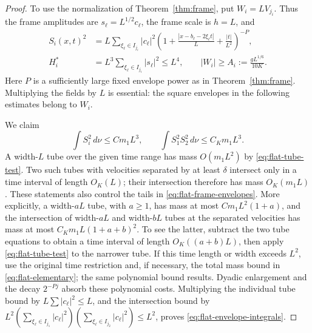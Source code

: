 \begin{proof}
To use the normalization of Theorem~\ref{thm:frame}, put
$W_i=LV_{j_i}$.  Thus the frame amplitudes are
$s_\ell=L^{1/2}c_\ell$, the frame scale is $h=L$, and
\begin{align}
 S_i(x,t)^2
   &=L\sum_{\xi_\ell\in I_{j_i}}|c_\ell|^2
     \left(1+\frac{|x-b_\ell-2\xi_\ell t|}{L}
                  +\frac{|t|}{L^2}\right)^{-P},
       \label{eq:flat-frame-envelopes}\\
 H_i^*&=L^3\sum_{\xi_\ell\in I_{j_i}}|s_\ell|^2\leq L^4,
 \qquad |W_i|\geq A_i:=\frac{gL^{1/6}}{10K}.
       \label{eq:flat-frame-levels}
\end{align}
Here $P$ is a sufficiently large fixed envelope power as in
Theorem~\ref{thm:frame}.  Multiplying the fields by $L$ is essential:
the square envelopes in the following estimates belong to $W_i$.

We claim
\begin{equation}\label{eq:flat-envelope-integrals}
 \int S_i^2\,d\nu\leq C m_1L^3,
 \qquad
 \int S_1^2S_2^2\,d\nu\leq C_Km_1L^3.
\end{equation}
A width-$L$ tube over the given time range has mass $O(m_1L^2)$ by
\eqref{eq:flat-tube-test}.  Two such tubes with velocities separated
by at least $\delta$ intersect only in a time interval of length
$O_K(L)$; their intersection therefore has mass $O_K(m_1L)$.
These statements also control the tails in
\eqref{eq:flat-frame-envelopes}.  More explicitly, a width-$aL$ tube,
with $a\geq1$, has mass at most $C m_1L^2(1+a)$, and the intersection
of width-$aL$ and width-$bL$ tubes at the separated velocities has
mass at most $C_Km_1L(1+a+b)^2$.  To see the latter, subtract the two
tube equations to obtain a time interval of length $O_K((a+b)L)$,
then apply \eqref{eq:flat-tube-test} to the narrower tube.  If this
time length or width exceeds $L^2$, use the original time restriction
and, if necessary, the total mass bound in
\eqref{eq:flat-elementary}; the same polynomial bound results.
Dyadic enlargement and the decay $2^{-Pj}$ absorb these polynomial
costs.  Multiplying the individual tube bound by
$L\sum|c_\ell|^2\leq L$, and the intersection bound by
$L^2(\sum_{\xi_\ell\in I_{j_1}}|c_\ell|^2)
      (\sum_{\xi_\ell\in I_{j_2}}|c_\ell|^2)\leq L^2$,
proves \eqref{eq:flat-envelope-integrals}.


\end{proof}
